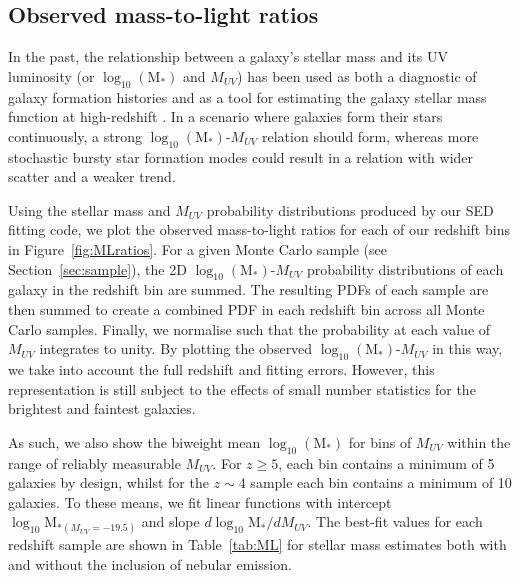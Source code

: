 \subsection{Observed mass-to-light ratios}\label{subsec:masslightratios}
In the past, the relationship between a galaxy's stellar mass and its UV luminosity (or $\log_{10} (\text{M}_{*})$ and $M_{UV}$) has been used as both a diagnostic of galaxy formation histories \citep{2009ApJ...697.1493S} and as a tool for estimating the galaxy stellar mass function at high-redshift \citep{Gonzalez:2011dn}. In a scenario where galaxies form their stars continuously, a strong $\log_{10} (\text{M}_{*})$-$M_{UV}$ relation should form, whereas more stochastic bursty star formation modes could result in a relation with wider scatter and a weaker trend.

Using the stellar mass and $M_{UV}$ probability distributions produced by our SED fitting code, we plot the observed mass-to-light ratios for each of our redshift bins in Figure~\ref{fig:MLratios}. For a given  Monte Carlo sample (see Section~\ref{sec:sample}), the 2D $\log_{10} (\text{M}_{*})$-$M_{UV}$ probability distributions of each galaxy in the redshift bin are summed. The resulting PDFs of each sample are then summed to create a combined PDF in each redshift bin across all Monte Carlo samples. Finally, we normalise such that the probability at each value of $M_{UV}$ integrates to unity. By plotting the observed $\log_{10} (\text{M}_{*})$-$M_{UV}$ in this way, we take into account the full redshift and fitting errors. However, this representation is still subject to the effects of small number statistics for the brightest and faintest galaxies. 

As such, we also show the biweight mean $\log_{10}(\text{M}_{*})$ for bins of $M_{UV}$ within the range of reliably measurable $M_{UV}$. For $z \geq 5$, each bin contains a minimum of 5 galaxies by design, whilst for the $z \sim 4$ sample each bin contains a minimum of 10 galaxies. To these means, we fit linear functions with intercept $\log_{10}\text{M}_{*(M_{UV}=-19.5)}$ and slope $d\log_{10}\text{M}_{*}/dM_{UV}$. The best-fit values for each redshift sample are shown in Table~\ref{tab:ML} for stellar mass estimates both with and without the inclusion of nebular emission. 


